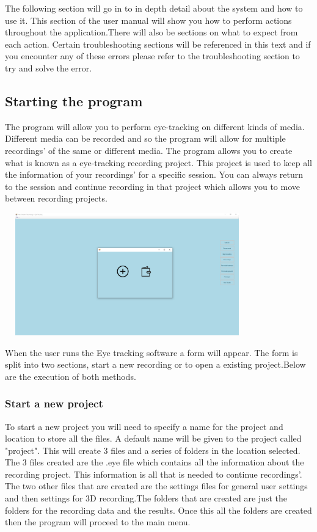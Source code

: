 The following section will go in to in depth detail about the system and how to use it. This section of the user manual will show you how to perform actions throughout the application.There will also be sections on what to expect from each action. Certain troubleshooting sections will be referenced in this text and if you encounter any of these errors please refer to the troubleshooting section to try and solve the error.

\subsection{Starting the program}
The program will allow you to perform eye-tracking on different kinds of media. Different media can be recorded and so the program will allow for multiple recordings' of the same or different media. The program allows you to create what is known as a eye-tracking recording project. This project is used to keep all the information of your recordings' for a specific session. You can always return to the session and continue recording in that project which allows you to move between recording projects.\newline

\includegraphics[width=400px,height=200px]{./Images/StartupPage.PNG}

When the user runs the Eye tracking software a form will appear. The form is split into two sections, start a new recording or to open a existing project.Below are the execution of both methods.

\subsubsection{Start a new project} 
To start a new project you will need to specify a name for the project and location to store all the files. A default name will be given to the project called "project". This will create 3 files and a series of folders in the location selected. The 3 files created are the .eye file which contains all the information about the recording project. This information is all that is needed to continue recordings'. The two other files that are created are the settings files for general user settings and then settings for 3D recording.The folders that are created are just the folders for the recording data and the results. Once this all the folders are created then the program will proceed to the main menu.

